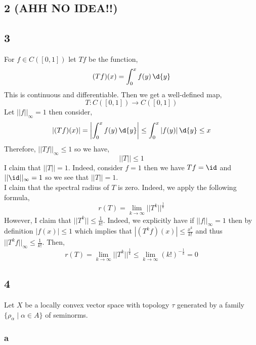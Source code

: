 \documentclass[12pt]{article}
\begin{document}
\subsection{2 (AHH NO IDEA!!)}



\subsection{3}

For $f \in C([0,1])$ let $T f$ be the function,
\[ (Tf)(x) = \int_0^x f(y) \, \d{y} \]
This is continuous and differentiable. Then we get a well-defined map,
\[ T : C([0,1]) \to C([0,1]) \]
Let $|| f ||_{\infty} = 1$ then consider,
\[ | (Tf)(x)| = \left| \int_0^x f(y) \, \d{y} \right| \le \int_0^x | f(y) | \, \d{y} \le x \]
Therefore, $|| T f ||_{\infty} \le 1$ so we have,
\[ || T || \le 1 \]
I claim that $|| T || = 1$. Indeed, consider $f = 1$ then we have $T f = \id$ and $|| \id ||_{\infty} = 1$ so we see that $|| T || = 1$.
\bigskip\\
I claim that the spectral radius of $T$ is zero. Indeed, we apply the following formula,
\[ r(T) = \lim_{k \to \infty} || T^k ||^{\frac{1}{k}} \]
However, I claim that $|| T^k || \le \frac{1}{k!}$. Indeed, we explicitly have if $|| f ||_{\infty} = 1$ then by definition $|f(x)| \le 1$ which implies that $| (T^k f)(x) | \le \frac{x^k}{k!}$ and thus $ || T^k f ||_{\infty} \le \frac{1}{k!}$. Then,
\[ r(T) = \lim_{k \to \infty} || T^k ||^{\frac{1}{k}} \le \lim_{k \to \infty} (k!)^{-\frac{1}{k}} = 0 \]


\subsection{4}

Let $X$ be a locally convex vector space with topology $\tau$ generated by a family $\{ \rho_\alpha \mid \alpha \in A \}$ of seminorms.

\subsubsection{a}
\end{document}
